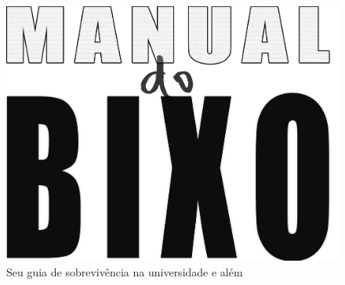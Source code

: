 \documentclass[a4paper,10pt,oldfontcommands]{memoir}
\begin{document}
\cleardoublepage
\begin{figure}[H]
    \centering
    \includegraphics[width=.85\textwidth]{img/manual_logo.png}
    \caption*{\textsf{\huge Seu guia de sobrevivência na universidade e além}}
\end{figure}
\end{document}

